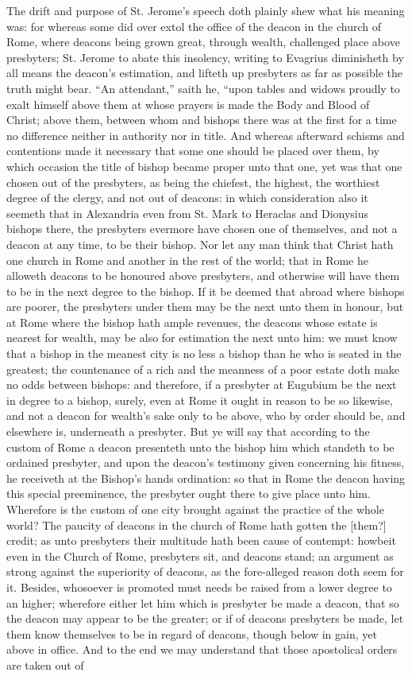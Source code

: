 The drift and purpose of St. Jerome’s speech doth plainly shew what his meaning was: for whereas some did over extol the office of the deacon in the church of Rome, where deacons being grown great, through wealth, challenged place above presbyters; St. Jerome to abate this insolency, writing to Evagrius diminisheth by all means the deacon’s estimation, and lifteth up presbyters as far as possible the truth might bear. “An attendant,” saith he, “upon tables and widows proudly to exalt himself above them at whose prayers is made the Body and Blood of Christ; above them, between whom and bishops there was at the first for a time no difference neither in authority nor in title. And whereas afterward schisms and contentions made it necessary that some one should be placed over them, by which occasion the title of bishop became proper unto that one, yet was that one chosen out of the presbyters, as being the chiefest, the highest, the worthiest degree of the clergy, and not out of deacons: in which consideration also it seemeth that in  Alexandria even from St. Mark to Heraclas and Dionysius bishops there, the presbyters evermore have chosen one of themselves, and not a deacon at any time, to be their bishop. Nor let any man think that Christ hath one church in Rome and another in the rest of the world; that in Rome he alloweth deacons to be honoured above presbyters, and otherwise will have them to be in the next degree to the bishop. If it be deemed that abroad where bishops are poorer, the presbyters under them may be the next unto them in honour, but at Rome where the bishop hath ample revenues, the deacons whose estate is nearest for wealth, may be also for estimation the next unto him: we must know that a bishop in the meanest city is no less a bishop than he who is seated in the greatest; the countenance of a rich and the meanness of a poor estate doth make no odds between bishops: and therefore, if a presbyter at Eugubium be the next in degree to a bishop, surely, even at Rome it ought in reason to be so likewise, and not a deacon for wealth’s sake only to be above, who by order should be, and elsewhere is, underneath a presbyter. But ye will say that according to the custom of Rome a deacon presenteth unto the bishop him which standeth to be ordained presbyter, and upon the deacon’s testimony given concerning his fitness, he receiveth at the Bishop’s hands ordination: so that in Rome the deacon having this special preeminence, the presbyter ought there to give place unto him. Wherefore is the custom of one city brought against the practice of the whole world? The paucity of deacons in the church of Rome hath gotten the [them?] credit; as unto presbyters their multitude hath been cause of contempt: howbeit even in the Church of Rome, presbyters sit, and deacons stand; an argument as strong against the superiority of deacons, as the fore-alleged reason doth seem for it. Besides, whosoever is promoted must needs be raised from a lower degree to an higher; wherefore either let him which is presbyter be made a deacon, that so the deacon may appear to be the greater; or if of deacons presbyters be made, let them know themselves to be in regard of deacons, though below in gain, yet above in office. And to the end we may understand that those apostolical orders are taken out of 